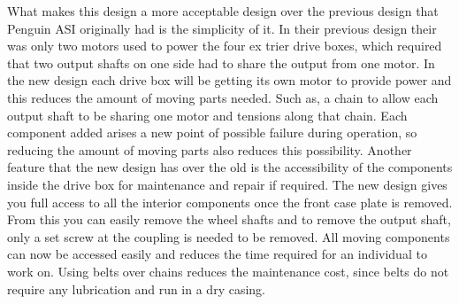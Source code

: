 

What makes this design a more acceptable design over the previous design that Penguin ASI originally had is the simplicity of it. In their previous design their was only two motors used to power the four ex trier drive boxes, which required that two output shafts on one side had to share the output from one motor. In the new design each drive box will be getting its own motor to provide power and this reduces the amount of moving parts needed. Such as, a chain to allow each output shaft to be sharing one motor and tensions along that chain. Each component added arises a new point of possible failure during operation, so reducing the amount of moving parts also reduces this possibility. Another feature that the new design has over the old is the accessibility of the components inside the drive box for maintenance and repair if required. The new design gives you full access to all the interior components once the front case plate is removed. From this you can easily remove the wheel shafts and to remove the output shaft, only a set screw at the coupling is needed to be removed. All moving components can now be accessed easily and reduces the time required for an individual to work on. Using belts over chains reduces the maintenance cost, since belts do not require any lubrication and run in a dry casing.



